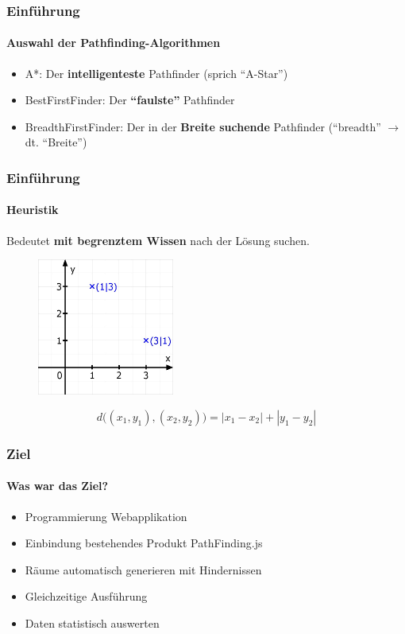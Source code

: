 \documentclass[professionalfont,serif,german]{beamer}
\begin{document}
\begin{frame}
  \frametitle{Einführung}
  \framesubtitle{Auswahl der Pathfinding-Algorithmen}
  \begin{itemize}
    \item \textcolor{pfblue}{A*}: Der \textbf{intelligenteste} Pathfinder (sprich ``A-Star'')
    \item \textcolor{pfred}{BestFirstFinder}: Der \textbf{``faulste''} Pathfinder
    \item \textcolor{pfgreen}{BreadthFirstFinder}: Der in der \textbf{Breite suchende} Pathfinder (``breadth'' $\rightarrow$ dt. ``Breite'')
  \end{itemize}
\end{frame}

\begin{frame}
  \frametitle{Einführung}
  \framesubtitle{Heuristik}
  Bedeutet \textbf{mit begrenztem Wissen} nach der Lösung suchen.
  \begin{figure}
    \centering
    \includegraphics[height=4.5cm]{img/mathegrafix.jpg}
  \end{figure}
  \begin{equation*}
    d\big((x_1,y_1),(x_2,y_2)\big) = |x_1 - x_{2}| + |y_{1} - y_{2}|
  \end{equation*}
\end{frame}


\begin{frame}
  \frametitle{Ziel}
  \framesubtitle{Was war das Ziel?}
  \begin{itemize}
    \item Programmierung Webapplikation
    \item Einbindung bestehendes Produkt PathFinding.js
    \item Räume automatisch generieren mit Hindernissen %
    \item Gleichzeitige Ausführung
    \item Daten statistisch auswerten
  \end{itemize}
\end{frame}
\end{document}
